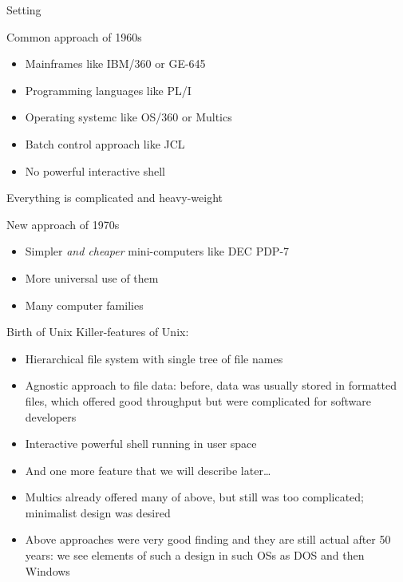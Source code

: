 \documentclass[xetex,aspectratio=149]{beamer}
\begin{document}
\begin{frame}{Setting}
	\begin{block}{Common approach of 1960s}
		\begin{itemize}
			\item Mainframes like IBM/360 or GE-645
			\item Programming languages like PL/I
			\item Operating systemc like OS/360 or Multics
			\item Batch control approach like JCL
			\item No powerful interactive shell
		\end{itemize}
		Everything is complicated and heavy-weight
	\end{block}
\pause
	\begin{block}{New approach of 1970s}
	\begin{itemize}
		\item Simpler \emph{and cheaper} mini-computers like DEC PDP-7
		\item More universal use of them
		\item Many computer families
	\end{itemize}
\end{block}
\end{frame}

\begin{frame}{Birth of Unix}
Killer-features of Unix:

\begin{itemize}
	\item Hierarchical file system with single tree of file names
	\item Agnostic approach to file data: before, data was usually stored in formatted files, which offered good throughput but were complicated for software developers
	\item Interactive powerful shell running in user space
	\pause
	\item And one more feature that we will describe later\ldots
\end{itemize}

\pause

\begin{itemize}
	\item Multics already offered many of above, but still was too complicated; minimalist design was desired
	\item Above approaches were very good finding and they are still actual after 50 years: we see elements of such a design in such OSs as DOS and then Windows
\end{itemize}

\end{frame}
\end{document}
